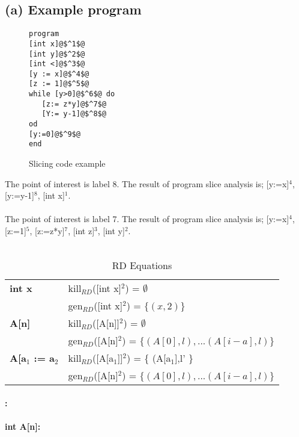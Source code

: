 \documentclass[12pt]{article}
\begin{document}
\subsection*{(a) Example program}
\begin{figure}
\begin{lstlisting}
program
[int x]@$^1$@
[int y]@$^2$@
[int <]@$^3$@
[y := x]@$^4$@
[z := 1]@$^5$@
while [y>0]@$^6$@ do
   [z:= z*y]@$^7$@
   [Y:= y-1]@$^8$@
od
[y:=0]@$^9$@
end
\end{lstlisting}
\label{source:example2}
\caption{Slicing code example}
\end{figure}

The point of interest is label 8.  The result of program slice analysis is; [y:=x]$^4$, [y:=y-1]$^8$, [int x]$^1$.\\\\

The point of interest is label 7.  The result of program slice analysis is; [y:=x]$^4$, [z:=1]$^5$, [z:=z*y]$^7$, [int z]$^3$, [int y]$^2$.\\\\


\begin{table}[h]
    \begin{tabular}{l | l }
    \textbf{int x} &  kill$_{RD}$([int x]$^2$) = $\emptyset$ \\
                   &  gen$_{RD}$([int x]$^2$) = $\{(x,2)\}$ \\
    \hline
    \textbf{A[n]} & kill$_{RD}$([A[n]]$^2$) = $\emptyset$\\
                  & gen$_{RD}$([A[n]$^2$) = $\{(A[0],l), ... (A[i-a],l)\}$ \\

    \hline
    \textbf{A[a$_1$ := a$_2$} & kill$_{RD}$([A[a$_1$]]$^2$) = \{ (A[a$_1$],l' \} \\
                              & gen$_{RD}$([A[n]$^2$) = $\{(A[0],l), ... (A[i-a],l)\}$ \\

    \end{tabular}
    \centering
	\caption{RD Equations}
	\label{table:rd_equations}
\end{table}


\paragraph*{:}

\paragraph*{int A[n]:}
\end{document}
